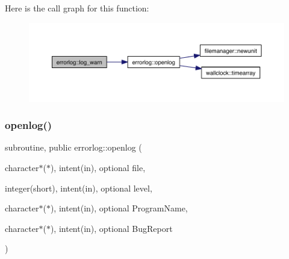 Here is the call graph for this function\+:\nopagebreak
\begin{figure}[H]
\begin{center}
\leavevmode
\includegraphics[width=350pt]{namespaceerrorlog_ac0a3d2c2bcdb3af8e91b4a27d2ac5ac0_cgraph}
\end{center}
\end{figure}
\mbox{\label{namespaceerrorlog_a32bbf87dd265de25bd10ea31d95b751d}} 
\subsubsection{\texorpdfstring{openlog()}{openlog()}}
{\footnotesize\ttfamily subroutine, public errorlog\+::openlog (\begin{DoxyParamCaption}\item[{character$\ast$($\ast$), intent(in), optional}]{file,  }\item[{integer(short), intent(in), optional}]{level,  }\item[{character$\ast$($\ast$), intent(in), optional}]{Program\+Name,  }\item[{character$\ast$($\ast$), intent(in), optional}]{Bug\+Report }\end{DoxyParamCaption})}

